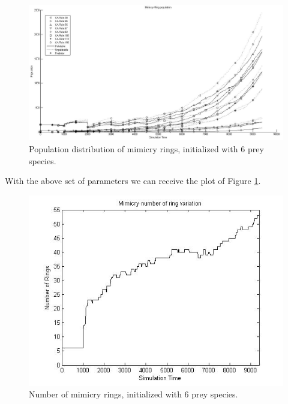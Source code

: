 \begin{figure}[H]
	\centering
	\includegraphics[scale=0.40]{images/simTime10k-6Prey}
	\caption[Population distribution of mimicry rings (6 prey species)]{Population distribution of mimicry rings, initialized with 6 prey species.}
	\label{fig:plot-6-prey}
\end{figure}

With the above set of parameters we can receive the plot of Figure \ref{fig:plot-6-prey}. 

\begin{figure}[H]
	\centering
	\includegraphics[scale=0.50]{images/ringSize10k-6Prey}
	\caption[Number of mimicry rings (6 prey species)]{Number of mimicry rings, initialized with 6 prey species.}
	\label{fig:ringSize10k-6-Prey}
\end{figure}

